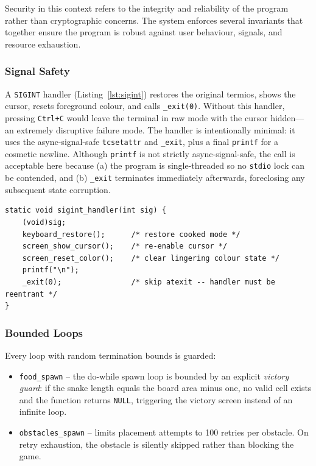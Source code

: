 \documentclass[conference]{IEEEtran}
\begin{document}
Security in this context refers to the integrity and reliability of the program rather than cryptographic concerns. The system enforces several invariants that together ensure the program is robust against user behaviour, signals, and resource exhaustion.

\subsubsection{Signal Safety}
A \texttt{SIGINT} handler (Listing~\ref{lst:sigint}) restores the original termios, shows the cursor, resets foreground colour, and calls \texttt{\_exit(0)}. Without this handler, pressing \texttt{Ctrl+C} would leave the terminal in raw mode with the cursor hidden---an extremely disruptive failure mode. The handler is intentionally minimal: it uses the async-signal-safe \texttt{tcsetattr} and \texttt{\_exit}, plus a final \texttt{printf} for a cosmetic newline. Although \texttt{printf} is not strictly async-signal-safe, the call is acceptable here because (a) the program is single-threaded so no \texttt{stdio} lock can be contended, and (b) \texttt{\_exit} terminates immediately afterwards, foreclosing any subsequent state corruption.

\begin{lstlisting}[caption={Async-signal-safe terminal restoration on Ctrl+C.},label={lst:sigint}]
static void sigint_handler(int sig) {
    (void)sig;
    keyboard_restore();      /* restore cooked mode */
    screen_show_cursor();    /* re-enable cursor */
    screen_reset_color();    /* clear lingering colour state */
    printf("\n");
    _exit(0);                /* skip atexit -- handler must be reentrant */
}
\end{lstlisting}

\subsubsection{Bounded Loops}
Every loop with random termination bounds is guarded:
\begin{itemize}
    \item \texttt{food\_spawn} -- the do-while spawn loop is bounded by an explicit \emph{victory guard}: if the snake length equals the board area minus one, no valid cell exists and the function returns \texttt{NULL}, triggering the victory screen instead of an infinite loop.
    \item \texttt{obstacles\_spawn} -- limits placement attempts to 100 retries per obstacle. On retry exhaustion, the obstacle is silently skipped rather than blocking the game.
\end{itemize}
\end{document}
